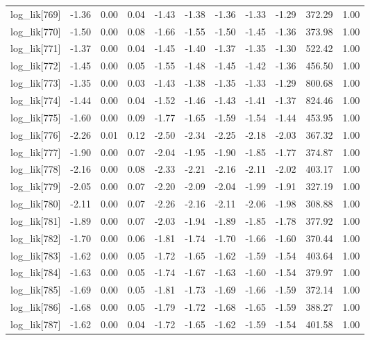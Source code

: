 \begin{table}[ht]
\begin{tabular}{rrrrrrrrrrr}
  log\_lik[769] & -1.36 & 0.00 & 0.04 & -1.43 & -1.38 & -1.36 & -1.33 & -1.29 & 372.29 & 1.00 \\ 
  log\_lik[770] & -1.50 & 0.00 & 0.08 & -1.66 & -1.55 & -1.50 & -1.45 & -1.36 & 373.98 & 1.00 \\ 
  log\_lik[771] & -1.37 & 0.00 & 0.04 & -1.45 & -1.40 & -1.37 & -1.35 & -1.30 & 522.42 & 1.00 \\ 
  log\_lik[772] & -1.45 & 0.00 & 0.05 & -1.55 & -1.48 & -1.45 & -1.42 & -1.36 & 456.50 & 1.00 \\ 
  log\_lik[773] & -1.35 & 0.00 & 0.03 & -1.43 & -1.38 & -1.35 & -1.33 & -1.29 & 800.68 & 1.00 \\ 
  log\_lik[774] & -1.44 & 0.00 & 0.04 & -1.52 & -1.46 & -1.43 & -1.41 & -1.37 & 824.46 & 1.00 \\ 
  log\_lik[775] & -1.60 & 0.00 & 0.09 & -1.77 & -1.65 & -1.59 & -1.54 & -1.44 & 453.95 & 1.00 \\ 
  log\_lik[776] & -2.26 & 0.01 & 0.12 & -2.50 & -2.34 & -2.25 & -2.18 & -2.03 & 367.32 & 1.00 \\ 
  log\_lik[777] & -1.90 & 0.00 & 0.07 & -2.04 & -1.95 & -1.90 & -1.85 & -1.77 & 374.87 & 1.00 \\ 
  log\_lik[778] & -2.16 & 0.00 & 0.08 & -2.33 & -2.21 & -2.16 & -2.11 & -2.02 & 403.17 & 1.00 \\ 
  log\_lik[779] & -2.05 & 0.00 & 0.07 & -2.20 & -2.09 & -2.04 & -1.99 & -1.91 & 327.19 & 1.00 \\ 
  log\_lik[780] & -2.11 & 0.00 & 0.07 & -2.26 & -2.16 & -2.11 & -2.06 & -1.98 & 308.88 & 1.00 \\ 
  log\_lik[781] & -1.89 & 0.00 & 0.07 & -2.03 & -1.94 & -1.89 & -1.85 & -1.78 & 377.92 & 1.00 \\ 
  log\_lik[782] & -1.70 & 0.00 & 0.06 & -1.81 & -1.74 & -1.70 & -1.66 & -1.60 & 370.44 & 1.00 \\ 
  log\_lik[783] & -1.62 & 0.00 & 0.05 & -1.72 & -1.65 & -1.62 & -1.59 & -1.54 & 403.64 & 1.00 \\ 
  log\_lik[784] & -1.63 & 0.00 & 0.05 & -1.74 & -1.67 & -1.63 & -1.60 & -1.54 & 379.97 & 1.00 \\ 
  log\_lik[785] & -1.69 & 0.00 & 0.05 & -1.81 & -1.73 & -1.69 & -1.66 & -1.59 & 372.14 & 1.00 \\ 
  log\_lik[786] & -1.68 & 0.00 & 0.05 & -1.79 & -1.72 & -1.68 & -1.65 & -1.59 & 388.27 & 1.00 \\ 
  log\_lik[787] & -1.62 & 0.00 & 0.04 & -1.72 & -1.65 & -1.62 & -1.59 & -1.54 & 401.58 & 1.00 \\ 

\end{tabular}
\end{table}
